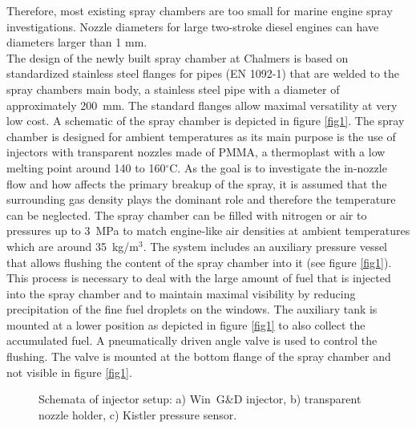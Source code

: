 \documentclass[letterpaper,twocolumn,10pt]{ilass}
\begin{document}
Therefore, most existing spray chambers are too small for marine engine spray investigations.
Nozzle diameters for large two-stroke diesel engines can have diameters larger than 1 mm.\\
%
The design of the newly built spray chamber at Chalmers is based on standardized stainless
steel flanges for pipes (EN 1092-1) that are welded to the spray chambers main body,
a stainless steel pipe with a diameter of approximately 200~mm. The standard flanges allow
maximal versatility at very low cost. A schematic of the spray chamber is depicted in figure
\ref{fig1}. The spray chamber is designed for ambient temperatures as its main purpose is the
use of injectors with transparent nozzles made of PMMA, a thermoplast with a low melting point
around 140 to 160$^{\circ}$C. As the goal is to investigate the in-nozzle flow and how 
affects the primary breakup of the spray, it is assumed that the surrounding gas density plays
the dominant role and therefore the temperature can be neglected. The spray chamber can be
filled with nitrogen or air to pressures up to 3~MPa to match engine-like air densities at
ambient temperatures which are around 35~kg/m$^3$. The system includes an auxiliary pressure
vessel that allows flushing the content of the spray chamber into it (see figure \ref{fig1}).
This process is necessary to deal with the large amount of fuel that is injected into the
spray chamber and to maintain maximal visibility by reducing precipitation of the fine fuel
droplets on the windows. The auxiliary tank is mounted at a lower position as depicted in
figure \ref{fig1} to also collect the accumulated fuel. A pneumatically driven angle valve
is used to control the flushing. The valve is mounted at the bottom flange of the spray
chamber and not visible in figure \ref{fig1}. 

\begin{figure}[h]
\begin{center}
\end{center}
\vspace*{-5mm}
\caption{Schemata of injector setup:
         a) Win~G\&D injector,
				 b) transparent nozzle holder,
				 c) Kistler pressure sensor.}
\label{fig2} 
\end{figure}
\end{document}
